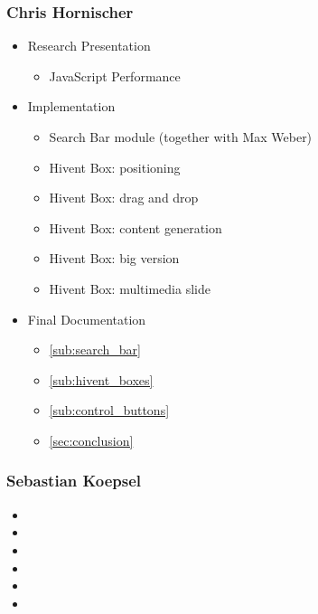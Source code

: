 
\subsubsection{Chris Hornischer} %
\label{ssub:chris_hornischer}

\begin{itemize}
  \item Research Presentation
  \begin{itemize}
    \item JavaScript Performance
  \end{itemize}
  \item Implementation
  \begin{itemize}
    \item Search Bar module (together with Max Weber)
    \item Hivent Box: positioning
    \item Hivent Box: drag and drop
    \item Hivent Box: content generation
    \item Hivent Box: big version
    \item Hivent Box: multimedia slide
  \end{itemize}
  \item Final Documentation
  \begin{itemize}
    \item \ref{sub:search_bar} 
    \item \ref{sub:hivent_boxes} 
    \item \ref{sub:control_buttons} 
    \item \ref{sec:conclusion} 
  \end{itemize}
\end{itemize}


\subsubsection{Sebastian Koepsel} %
\label{ssub:sebastian_koepsel}

\begin{itemize}
  \item
  \item
  \item
  \item
  \item
  \item
\end{itemize}

